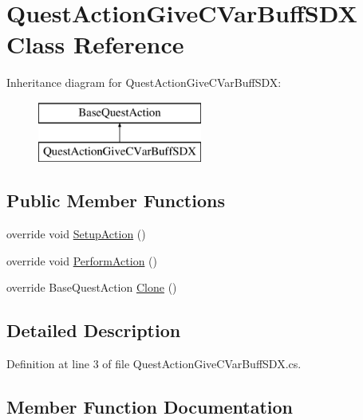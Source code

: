 \hypertarget{class_quest_action_give_c_var_buff_s_d_x}{}\section{Quest\+Action\+Give\+C\+Var\+Buff\+S\+DX Class Reference}
\label{class_quest_action_give_c_var_buff_s_d_x}
Inheritance diagram for Quest\+Action\+Give\+C\+Var\+Buff\+S\+DX\+:\begin{figure}[H]
\begin{center}
\leavevmode
\includegraphics[height=2.000000cm]{dc/d57/class_quest_action_give_c_var_buff_s_d_x}
\end{center}
\end{figure}
\subsection*{Public Member Functions}
\begin{DoxyCompactItemize}
\item 
override void \mbox{\hyperlink{class_quest_action_give_c_var_buff_s_d_x_a90630f27779caea686e2e3b00a8351d4}{Setup\+Action}} ()
\item 
override void \mbox{\hyperlink{class_quest_action_give_c_var_buff_s_d_x_a3ec449161980f4e59b59ace54d45a3a3}{Perform\+Action}} ()
\item 
override Base\+Quest\+Action \mbox{\hyperlink{class_quest_action_give_c_var_buff_s_d_x_a25e5a999286cefbb1fde7c00acd5a223}{Clone}} ()
\end{DoxyCompactItemize}


\subsection{Detailed Description}


Definition at line 3 of file Quest\+Action\+Give\+C\+Var\+Buff\+S\+D\+X.\+cs.



\subsection{Member Function Documentation}
\mbox{\label{class_quest_action_give_c_var_buff_s_d_x_a25e5a999286cefbb1fde7c00acd5a223}} 

